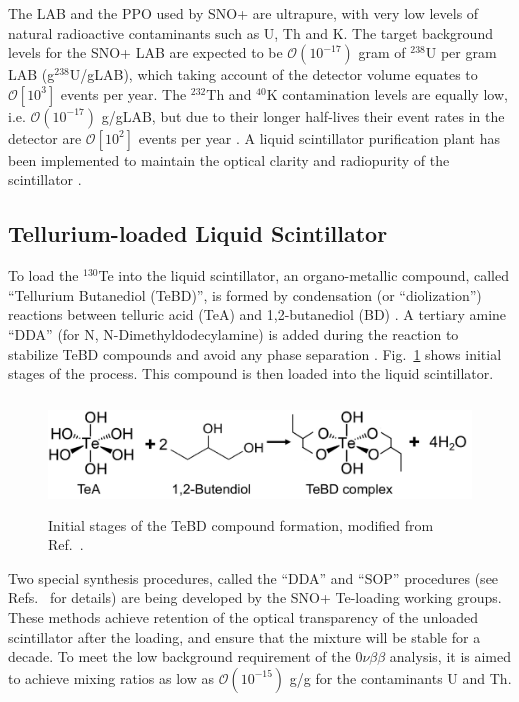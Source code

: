 The LAB and the PPO used by SNO+ are ultrapure, with very low levels of natural radioactive contaminants such as U, Th and K. The target background levels for the SNO+ LAB are expected to be $\mathcal O(10^{-17})$ gram of $^{238}$U per gram LAB (g$^{238}$U/gLAB), which taking account of the detector volume equates to $\mathcal{O}\left[10^3\right]$ events per year. The $^{232}$Th and $^{40}$K contamination levels are equally low, i.e. $\mathcal O(10^{-17})$ g/gLAB, but due to their longer half-lives their event rates in the detector are $\mathcal{O}\left[10^2\right]$ events per year \cite{snop_jinst,markchen_bkg}. A liquid scintillator purification plant has been implemented to maintain the optical clarity and radiopurity of the scintillator \cite{snop_jinst}.

\subsection{Tellurium-loaded Liquid Scintillator}\label{sect:TeLS_SNO+}

To load the $^{130}$Te into the liquid scintillator, an organo-metallic compound, called ``Tellurium Butanediol (TeBD)'', is formed by condensation (or ``diolization'') reactions between telluric acid (TeA) and 1,2-butanediol (BD) \cite{Paton:2019kgy}. A tertiary amine ``DDA'' (for N, N-Dimethyldodecylamine) is added during the reaction to stabilize TeBD compounds and avoid any phase separation \cite{teLoadingPaper}. Fig.~\ref{fig:paton_te} shows initial stages of the process. This compound is then loaded into the liquid scintillator.
\begin{figure}[!htb]
	\centering
	\includegraphics[height = 3cm]{TeBD_process.png}
	\caption{Initial stages of the TeBD compound formation, modified from Ref.~\cite{Paton:2019kgy}.}
	\label{fig:paton_te}
\end{figure}

Two special synthesis procedures, called the ``DDA'' and ``SOP'' procedures (see Refs.~\cite{biller2017new,teDDA,DDAvsSOP} for details) are being developed by the SNO+ Te-loading working groups. These methods achieve retention of the optical transparency of the unloaded scintillator after the loading, and ensure that the mixture will be stable for a decade. To meet the low background requirement of the $0\nu\beta\beta$ analysis, it is aimed to achieve mixing ratios as low as $\mathcal{O}(10^{-15})$ g/g for the contaminants U and Th. 

